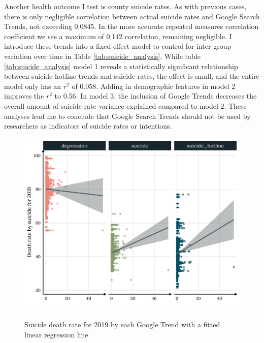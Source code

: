 Another health outcome I test is county suicide rates. As with previous cases,
there is only negligible correlation between actual suicide rates and Google
Search Trends, not exceeding 0.0845. In the more accurate repeated measures
correlation coefficient we see a maximum of 0.142 correlation, remaining
negligible. I introduce these trends into a fixed effect model to control for
inter-group variation over time in Table \ref{tab:suicide_analysis}. While table
\ref{tab:suicide_analysis} model 1 reveals a statistically significant
relationship between suicide hotline trends and suicide rates, the effect is
small, and the entire model only has an $r^2$ of 0.058. Adding in demographic
features in model 2 improves the $r^2$ to 0.56. In model 3, the inclusion of
Google Trends decreases the overall amount of suicide rate variance explained
compared to model 2. These analyses lead me to conclude that Google Search
Trends should not be used by researchers as indicators of suicide rates or
intentions.



\begin{figure}[h]
{\centering \includegraphics[width=0.8\linewidth]{figs/paper1/suicide_plot-1.pdf}}
\caption{Suicide death rate for 2019 by each Google Trend with a fitted linear regression line}\label{fig:suicide_plot-1}
\end{figure}

